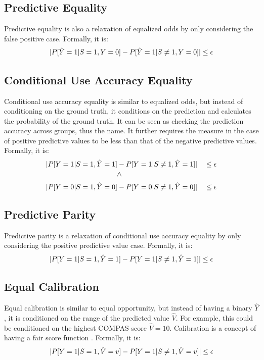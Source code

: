 \documentclass[conference]{IEEEtran}
\begin{document}
\subsection{Predictive Equality}
Predictive equality \cite{corbett2017algorithmic} is also a relaxation of equalized odds by only considering the false positive case. Formally, it is:
\begin{align*}
    \lvert P[\hat{Y} = 1 | S = 1, Y = 0] - P[\hat{Y} = 1 | S \neq 1, Y = 0]\rvert \leq \epsilon
\end{align*}

\subsection{Conditional Use Accuracy Equality}
Conditional use accuracy equality \cite{berk2021fairness} is similar to equalized odds, but instead of conditioning on the ground truth, it conditions on the prediction and calculates the probability of the ground truth. It can be seen as checking the prediction accuracy across groups, thus the name. It further requires the measure in the case of positive predictive values to be less than that of the negative predictive values. Formally, it is:
\begin{align*}
    \abs{P[Y = 1 | S = 1, \hat{Y} = 1] & - P[Y = 1 | S \neq 1, \hat{Y} = 1]} && \leq \epsilon \\
    & \rotatebox{90}{>} && \\
    \abs{P[Y = 0 | S = 1, \hat{Y} = 0] & - P[Y = 0 | S \neq 1, \hat{Y} = 0]} && \leq \epsilon
\end{align*}

\subsection{Predictive Parity}
Predictive parity \cite{chouldechova2017fair} is a relaxation of conditional use accuracy equality by only considering the positive predictive value case. Formally, it is:
\begin{align*}
    \lvert P[Y = 1 | S = 1, \hat{Y} = 1] - P[Y = 1 | S \neq 1, \hat{Y} = 1]\rvert \leq \epsilon
\end{align*}

\subsection{Equal Calibration}
Equal calibration \cite{chouldechova2017fair} is similar to equal opportunity, but instead of having a binary $\hat{Y}$, it is conditioned on the range of the predicted value $\hat{V}$. For example, this could be conditioned on the highest COMPAS score $\hat{V} = 10$. Calibration is a concept of having a fair score function \cite{fraenkel2020fairness}. Formally, it is:
\begin{align*}
    \lvert P[Y = 1 | S = 1, \hat{V} = v] - P[Y = 1 | S \neq 1, \hat{V} = v]\rvert \leq \epsilon
\end{align*}
\end{document}
